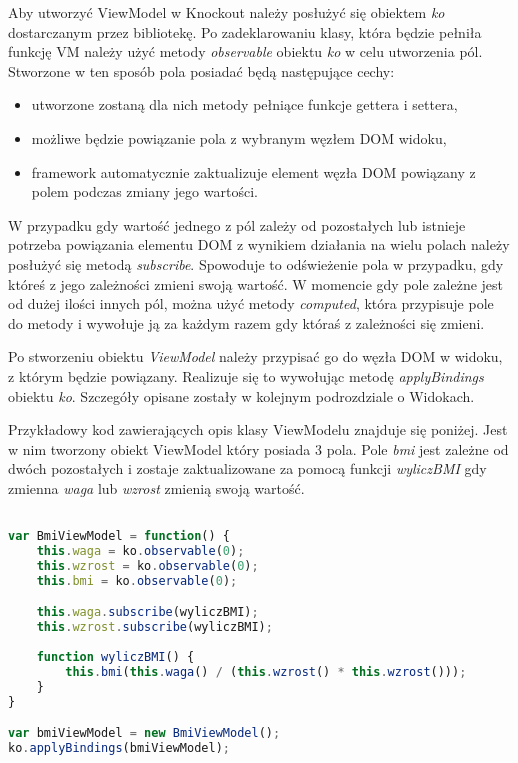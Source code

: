 Aby utworzyć ViewModel w Knockout należy posłużyć się obiektem \textit{ko} dostarczanym przez bibliotekę. Po zadeklarowaniu klasy, która będzie pełniła funkcję VM należy użyć metody \textit{observable} obiektu \textit{ko} w celu utworzenia pól. Stworzone w ten sposób pola posiadać będą następujące cechy:
\begin{itemize}
\item utworzone zostaną dla nich metody pełniące funkcje gettera i settera,
\item możliwe będzie powiązanie pola z wybranym węzłem DOM widoku,
\item framework automatycznie zaktualizuje element węzła DOM powiązany z polem podczas zmiany jego wartości.
\end{itemize}

W przypadku gdy wartość jednego z pól zależy od pozostałych lub istnieje potrzeba powiązania elementu DOM z wynikiem działania na wielu polach należy posłużyć się metodą \textit{subscribe}.
Spowoduje to odświeżenie pola w przypadku, gdy któreś z jego zależności zmieni swoją wartość. W momencie gdy pole zależne jest od dużej ilości innych pól, można użyć metody \textit{computed}, która przypisuje pole do metody i wywołuje ją za każdym razem gdy któraś z zależności się zmieni.

Po stworzeniu obiektu \textit{ViewModel} należy przypisać go do węzła DOM w widoku, z którym będzie powiązany. Realizuje się to wywołując metodę \textit{applyBindings} obiektu \textit{ko}. Szczegóły opisane zostały w kolejnym podrozdziale o Widokach.

Przykładowy kod zawierających opis klasy ViewModelu znajduje się poniżej. Jest w nim tworzony obiekt ViewModel który posiada 3 pola. Pole \textit{bmi} jest zależne od dwóch pozostałych i zostaje zaktualizowane za pomocą funkcji \textit{wyliczBMI} gdy zmienna  \textit{waga} lub \textit{wzrost} zmienią swoją wartość.

\begin{lstlisting}[language=JavaScript]

var BmiViewModel = function() {
	this.waga = ko.observable(0);
	this.wzrost = ko.observable(0);
	this.bmi = ko.observable(0);

    this.waga.subscribe(wyliczBMI);
    this.wzrost.subscribe(wyliczBMI);
	
	function wyliczBMI() {
		this.bmi(this.waga() / (this.wzrost() * this.wzrost()));
	}
}

var bmiViewModel = new BmiViewModel();
ko.applyBindings(bmiViewModel);

\end{lstlisting}


